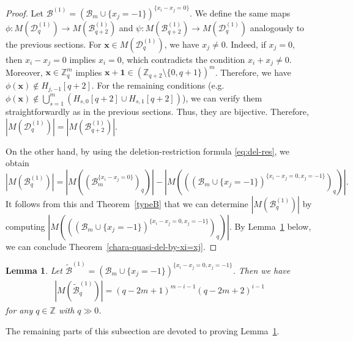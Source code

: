 \documentclass{article}
\theoremstyle{plain}
\newtheorem{Lem}[Them]{Lemma}
\theoremstyle{definition}
\theoremstyle{remark}
\numberwithin{equation}{section}
\newcommand{\Bc}{\mathcal{B}}
\newcommand{\Dc}{\mathcal{D}}
\newcommand{\ZZ}{\mathbb{Z}}
\begin{document}
\begin{proof}
Let $\Bc^{(1)} = (\Bc_m \cup \{x_j = -1\})^{\{x_i-x_j = 0\}}$. 
We define the same maps $\phi : M(\Dc^{(1)}_q) \to M(\Bc^{(1)}_{q+2})$ and $\psi  : M(\Bc^{(1)}_{q+2}) \to M(\Dc^{(1)}_q)$ analogously to the previous sections. 
For $\bm{x} \in M(\Dc^{(1)}_q)$, we have $x_j \neq 0$. Indeed, if $x_j = 0$, then $x_i - x_j = 0$ implies $x_i = 0$, which contradicts the condition $x_i + x_j \neq 0$.
Moreover, $\bm{x} \in \ZZ_q^m$ implies $\bm{x} + \bm{1} \in (\ZZ_{q+2} \setminus \{0,q+1\})^m$. 
Therefore, we have $\phi(\bm{x}) \notin H_{j,-1}[q+2]$.
For the remaining conditions (e.g. $\phi(\bm{x}) \not\in \bigcup_{s=1}^m (H_{s,0}[q+2] \cup H_{s,1}[q+2])$), we can verify them straightforwardly as in the previous sections. Thus, they are bijective. Therefore, $\left|M(\Dc^{(1)}_q)\right| = \left|M(\Bc^{(1)}_{q+2})\right|$. 

On the other hand, by using the deletion-restriction formula \eqref{eq:del-res}, we obtain 
\[|M(\Bc^{(1)}_q)| = |M((\Bc_m^{\{x_i-x_j=0\}})_q)| - |M(((\Bc_m \cup \{x_j = -1\})^{\{x_i-x_j=0, x_j=-1\}})_q)|.\] 
It follows from this and Theorem~\ref{typeB} that we can determine $|M(\Bc^{(1)}_q)|$ by computing $|M(((\Bc_m \cup \{x_j = -1\})^{\{x_i-x_j=0, x_j=-1\}})_q)|$. 
By Lemma~\ref{equality-xi=xj} below, we can conclude Theorem~\ref{chara-quasi-del-by-xi=xj}. 
\end{proof}

\begin{Lem}\label{equality-xi=xj}
     Let $\mathcal{\widetilde{B}}^{(1)} = (\Bc_m \cup \{x_j = -1\})^{\{x_i-x_j=0, x_j=-1\}}$. Then we have 
     \begin{align*}
         \left|M(\mathcal{\widetilde{B}}^{(1)}_q) \right|= (q-2m+1)^{m-i-1}(q-2m+2)^{i-1}
     \end{align*}
for any $q\in\ZZ$ with $q\gg 0$.
\end{Lem}
The remaining parts of this subsection are devoted to proving Lemma~\ref{equality-xi=xj}. 
\end{document}
